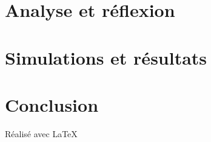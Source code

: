 \documentclass[a4paper]{report}
\theoremstyle{definition}
\begin{document}
\tableofcontents
\thispagestyle{empty}







\chapter{Analyse et r\'eflexion}\label{analyse}



\chapter{Simulations et r\'esultats}\label{intro}



\chapter{Conclusion}\label{intro}


\vfill
{\raggedleft R\'ealis\'e avec \LaTeX{} \par}
\end{document}

